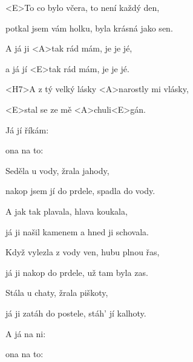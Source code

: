 

\zs
<E>To co bylo včera, to není každý den,

potkal jsem vám holku, byla krásná jako sen.
\ks

\zr
A já ji <A>tak rád mám, je je jé,

a já jí <E>tak rád mám, je je jé.

<H7>A z tý velký lásky <A>narostly mi vlásky,

<E>stal se ze mě <A>chuli<E>gán.
\kr

\zr \kr

\zs
Já jí říkám: 

ona na to: 
\ks

\zr \kr

\zs
Seděla u vody, žrala jahody,

nakop jsem jí do prdele, spadla do vody.
\ks

\zr \kr

\zs
A jak tak plavala, hlava koukala,

já ji našil kamenem a hned ji schovala.
\ks

\zr \kr

\zs
Když vylezla z vody ven, hubu plnou řas,

já ji nakop do prdele, už tam byla zas.
\ks

\zr \kr

\zs
Stála u chaty, žrala piškoty,

já ji zatáh do postele, stáh' jí kalhoty.
\ks

\zr \kr

\zs
A já na ni: 

ona na to: 
\ks

\zr \kr

\kp
